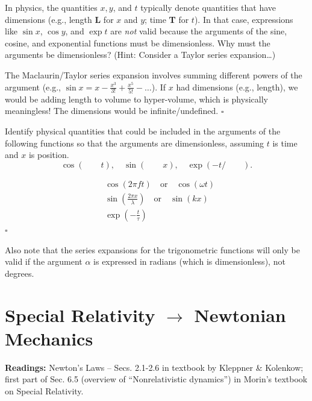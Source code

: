 \documentclass[11pt, letterpaper, openany]{book}
\newenvironment{exercise}[1][Exercise]{%
  \tcolorbox[blanker, breakable, left=1em,
    before skip=1em, after skip=1em,
    borderline west={3pt}{0pt}{PhysNavy},
    colback=PhysCream,
    before upper={\textcolor{PhysNavy}{\sffamily\bfseries #1:}\space}
  ]%
}{%
  \endtcolorbox%
}
\newenvironment{solution}[1][Solution]{%
  \tcolorbox[blanker, breakable, left=1em,
    before skip=1em, after skip=1em,
    borderline west={2pt}{0pt}{PhysTeal},
    colback=PhysCream,
    before upper={\textcolor{PhysTeal}{\sffamily\bfseries #1.}\space}
  ]%
}{%
  \hfill\textcolor{PhysTeal}{\ensuremath{\square}}\endtcolorbox%
}
\begin{document}
\begin{exercise}[Exercise 6]
In physics, the quantities $x, y$, and $t$ typically denote quantities that have dimensions (e.g., length \textbf{L} for $x$ and $y$; time \textbf{T} for $t$). In that case, expressions like $\sin x$, $\cos y$, and $\exp t$ are \textit{not} valid because the arguments of the sine, cosine, and exponential functions must be dimensionless. Why must the arguments be dimensionless? (Hint: Consider a Taylor series expansion\dots)
\end{exercise}
\begin{solution}
The Maclaurin/Taylor series expansion involves summing different powers of the argument (e.g., $\sin x = x - \frac{x^3}{3!} + \frac{x^5}{5!} - \dots$). If $x$ had dimensions (e.g., length), we would be adding length to volume to hyper-volume, which is physically meaningless! The dimensions would be infinite/undefined.
\end{solution}

\begin{exercise}[Quick Exercise 7]
Identify physical quantities that could be included in the arguments of the following functions so that the arguments are dimensionless, assuming $t$ is time and $x$ is position.
\[ \cos( \qquad t), \quad \sin( \qquad x ), \quad \exp(-t / \qquad ). \]
\end{exercise}
\begin{solution}
\begin{align*}
    &\cos(2\pi f t) \quad \text{or} \quad \cos(\omega t) \\
    &\sin\left(\frac{2\pi x}{\lambda}\right) \quad \text{or} \quad \sin(kx) \\
    &\exp\left(-\frac{t}{\tau}\right)
\end{align*}
\end{solution}

Also note that the series expansions for the trigonometric functions will only be valid if the argument $\alpha$ is expressed in radians (which is dimensionless), not degrees.

\chapter{Special Relativity $\to$ Newtonian Mechanics}

\textbf{Readings:} Newton's Laws -- Secs. 2.1-2.6 in textbook by Kleppner \& Kolenkow; first part of Sec. 6.5 (overview of ``Nonrelativistic dynamics'') in Morin's textbook on Special Relativity.
\end{document}

